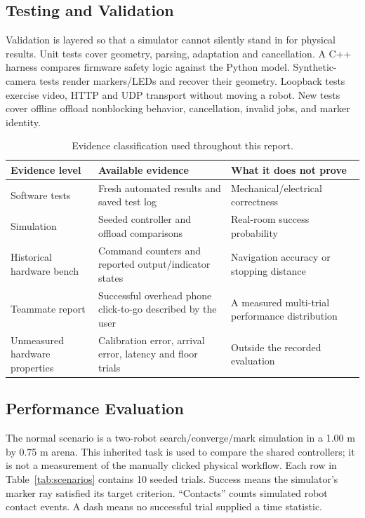 \documentclass[11pt,a4paper]{article}
\begin{document}
\subsection{Testing and Validation}
Validation is layered so that a simulator cannot silently stand in for physical
results. Unit tests cover geometry, parsing, adaptation and cancellation. A C++
harness compares firmware safety logic against the Python model. Synthetic-camera
tests render markers/LEDs and recover their geometry. Loopback tests exercise
video, HTTP and UDP transport without moving a robot. New tests cover offline
offload nonblocking behavior, cancellation, invalid jobs, and marker identity.



\begin{table}[ht]\centering\small
\begin{tabularx}{\textwidth}{@{}lYY@{}}\toprule
Evidence level & Available evidence & What it does not prove\\\midrule
Software tests & Fresh automated results and saved test log & Mechanical/electrical correctness\\
Simulation & Seeded controller and offload comparisons & Real-room success probability\\
Historical hardware bench & Command counters and reported output/indicator states & Navigation accuracy or stopping distance\\
Teammate report & Successful overhead phone click-to-go described by the user & A measured multi-trial performance distribution\\
Unmeasured hardware properties & Calibration error, arrival error, latency and floor trials & Outside the recorded evaluation\\\bottomrule
\end{tabularx}
\caption{Evidence classification used throughout this report.}
\end{table}

\subsection{Performance Evaluation}
The normal scenario is a two-robot search/converge/mark simulation in a 1.00 m by
0.75 m arena. This inherited task is used to compare the shared controllers;
it is not a measurement of the manually clicked physical workflow. Each row in
Table~\ref{tab:scenarios} contains 10 seeded trials. Success means the simulator's
marker ray satisfied its target criterion. ``Contacts'' counts simulated robot
contact events. A dash means no successful trial supplied a time statistic.
\end{document}
